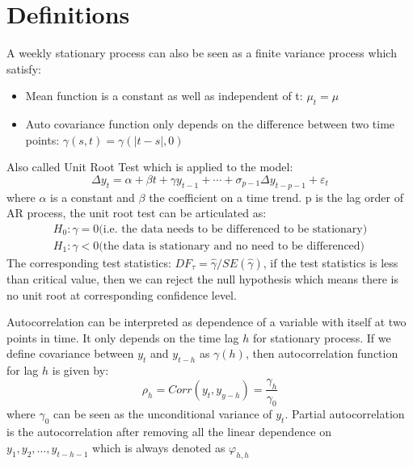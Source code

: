 \section{Definitions}

\begin{defn}\label{Definition of Stationarity}
A weekly stationary process can also be seen as a finite variance process which satisfy:
 \begin{itemize}
    \item Mean function is a constant as well as independent of t: $\mu_t=\mu$ 
    \item Auto covariance function only depends on the difference between two time points: $\gamma(s,t)=\gamma(|t-s|,0)$  
  \end{itemize}
\end{defn}

\begin{defn}\label{Definition of ADF}
Also called Unit Root Test which is applied to the model: 
\begin{equation}
\Delta y_t=\alpha+\beta t+\gamma y_{t-1}+\cdots+\sigma_{p-1}\Delta y_{t-p-1}+\varepsilon_t
\end{equation}
where $\alpha$ is a constant and $\beta$ the coefficient on a time trend. p is the lag order of AR process, the unit root test can be articulated as: 
\begin{align}
H_0: \gamma=0 \textrm{(i.e. the data needs to be differenced to be stationary)}\nonumber
\\ 
H_1: \gamma<0 \textrm{(the data is stationary and  no need to be differenced)}\nonumber
\end{align}
The corresponding test statistics: $DF_{\tau}=\hat{\gamma}/SE(\hat{\gamma})$, if the test statistics is less than critical value, then we can reject the null hypothesis which means there is no unit root at corresponding confidence level.
\end{defn}

\begin{defn}\label{Definition of ACF and PACF}
Autocorrelation can be interpreted as dependence of a variable with itself at two points in time. It only depends on the time lag $h$ for stationary process. If we define covariance between $y_t$ and $y_{t-h}$ as $\gamma(h)$, then autocorrelation function for lag $h$ is given by:
\begin{equation}
\rho_h=Corr(y_t,y_{y-h})=\frac{\gamma_h}{\gamma_0}
\end{equation}
where $\gamma_0$ can be seen as the unconditional variance of $y_t$. Partial autocorrelation is the autocorrelation after removing all the linear dependence on $y_1,y_2,\ldots,y_{t-h-1}$ which is always denoted as $\varphi_{h,h}$
\end{defn}

